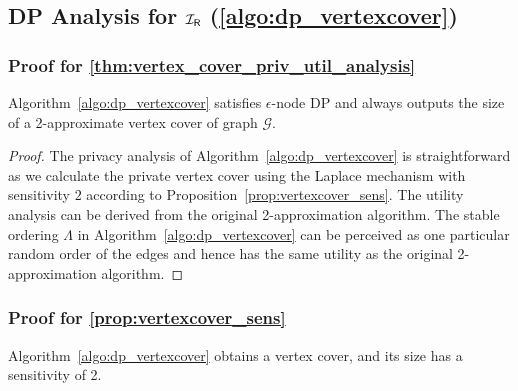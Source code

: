 \subsection{DP Analysis for $\mathcal{I_\mathsf{R}}$ (\cref{algo:dp_vertexcover})} \label{app:repair}

\subsubsection{Proof for \cref{thm:vertex_cover_priv_util_analysis}}
Algorithm~\ref{algo:dp_vertexcover} satisfies $\epsilon$-node DP and always outputs the size of a 2-approximate vertex cover of graph $\mathcal{G}$.
\begin{proof}
    The privacy analysis of Algorithm~\ref{algo:dp_vertexcover} is straightforward as we calculate the private vertex cover using the Laplace mechanism with sensitivity $2$ according to Proposition~\ref{prop:vertexcover_sens}. The utility analysis can be derived from the original 2-approximation algorithm. The stable ordering $\Lambda$ in Algorithm~\ref{algo:dp_vertexcover} can be perceived as one particular random order of the edges and hence has the same utility as the original 2-approximation algorithm.
\end{proof}


\subsubsection{Proof for \cref{prop:vertexcover_sens}}\label{app:vertext_cover_sensitivity}
Algorithm~\ref{algo:dp_vertexcover} obtains a vertex cover, and its size has a sensitivity of 2.

